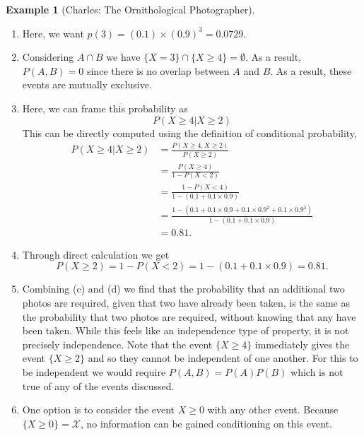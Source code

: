 \documentclass[
  letterpaper,
  DIV=11,
  numbers=noendperiod]{scrreprt}
\theoremstyle{definition}
\theoremstyle{definition}
\newtheorem{example}{Example}[chapter]
\theoremstyle{definition}
\theoremstyle{remark}
\begin{document}
\begin{example}[Charles: The Ornithological
Photographer]
\begin{tcolorbox}[enhanced jigsaw, colback=white, colframe=quarto-callout-color-frame, arc=.35mm, leftrule=.75mm, rightrule=.15mm, opacityback=0, breakable, bottomrule=.15mm, left=2mm, toprule=.15mm]
\begin{enumerate}
\def\labelenumi{\alph{enumi}.}
\item
  Here, we want \(p(3) = (0.1)\times(0.9)^3 = 0.0729\).
\item
  Considering \(A \cap B\) we have
  \(\{X = 3\} \cap \{X \geq 4\} = \emptyset\). As a result,
  \(P(A,B) = 0\) since there is no overlap between \(A\) and \(B\). As a
  result, these events are mutually exclusive.
\item
  Here, we can frame this probability as \[P(X \geq 4 | X \geq 2)\] This
  can be directly computed using the definition of conditional
  probability, \begin{align*}
   P(X \geq 4 | X \geq 2) &= \frac{P(X \geq 4, X \geq 2)}{P(X \geq 2)} \\
   &= \frac{P(X \geq 4)}{1 - P(X < 2)} \\
   &= \frac{1 - P(X < 4)}{1 - (0.1 + 0.1\times0.9)} \\
   &= \frac{1 - (0.1 + 0.1\times 0.9 + 0.1\times 0.9^2 + 0.1\times0.9^3)}{1 - (0.1 + 0.1\times 0.9)} \\
   &= 0.81.
  \end{align*}
\item
  Through direct calculation we get
  \[P(X \geq 2) = 1 - P(X < 2) = 1 - (0.1 + 0.1\times 0.9) = 0.81.\]
\item
  Combining (c) and (d) we find that the probability that an additional
  two photos are required, given that two have already been taken, is
  the same as the probability that two photos are required, without
  knowing that any have been taken. While this feels like an
  independence type of property, it is not precisely independence. Note
  that the event \(\{X \geq 4\}\) immediately gives the event
  \(\{X \geq 2\}\) and so they cannot be independent of one
  another.\footnotemark{} For this to be independent we would require
  \(P(A,B) = P(A)P(B)\) which is not true of any of the events
  discussed.
\item
  One option is to consider the event \(X \geq 0\) with any other event.
  Because \(\{X \geq 0\} = \mathcal{X}\), no information can be gained
  conditioning on this event.
\end{enumerate}

\end{tcolorbox}


\end{example}
\end{document}
